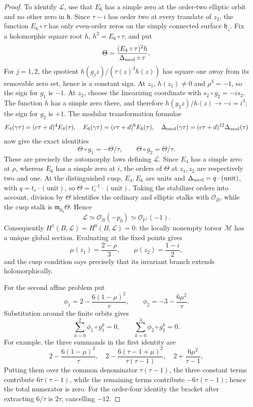 \begin{proof}
To identify \(\mathcal L\), use that \(E_6\) has a simple zero at the
order-two elliptic orbit and no other zero in \(\mathfrak h\).  Since
\(\tau-i\) has order two at every translate of \(z_2\), the function
\(E_6\circ\tau\) has only even-order zeros on the simply connected surface
\(\mathfrak h_z\).  Fix a holomorphic square root \(h\),
\(h^2=E_6\circ\tau\), and put
\[
 \Theta=\frac{(E_4\circ\tau)^2h}{\Delta_{\rm mod}\circ\tau}.
\]
For \(j=1,2\), the quotient
\(h(g_jz)/(\tau(z)^3h(z))\) has square one away from its removable zero
set, hence is a constant sign.  At \(z_1\), \(h(z_1)\ne0\) and
\(\rho^3=-1\), so the sign for \(g_1\) is \(-1\).  At \(z_2\), choose the
linearizing coordinate with \(s_2\circ g_2=-is_2\).  The function \(h\) has
a simple zero there, and therefore
\(h(g_2z)/h(z)\to-i=i^3\); the sign for \(g_2\) is \(+1\).  The modular
transformation formulae
\[
 E_4(\gamma\tau)=(c\tau+d)^4E_4(\tau),\quad
 E_6(\gamma\tau)=(c\tau+d)^6E_6(\tau),\quad
 \Delta_{\rm mod}(\gamma\tau)=(c\tau+d)^{12}\Delta_{\rm mod}(\tau)
\]
now give the exact identities
\[
 \Theta\circ g_1=-\Theta/\tau,\qquad
 \Theta\circ g_2=\Theta/\tau.
 \tag{2.1e}
\]
These are precisely the automorphy laws defining \(\mathcal L\).  Since
\(E_4\) has a simple zero at \(\rho\), whereas \(E_6\) has a simple zero
at \(i\), the orders of \(\Theta\) at \(z_1,z_2\) are respectively two
and one.  At the distinguished cusp, \(E_4,E_6\) are units and
\(\Delta_{\rm mod}=q\cdot(\text{unit})\), with
\(q=t_c\cdot(\text{unit})\), so
\(\Theta=t_c^{-1}\cdot(\text{unit})\).
Taking the stabilizer orders into account, division by \(\Theta\) identifies
the ordinary and elliptic stalks with \(\mathcal O_B\), while the cusp stalk
is \(\mathfrak m_{p_0}\Theta\).  Hence
\[
 \mathcal L\simeq\mathcal O_B(-p_0)\simeq\mathcal O_{\mathbb P^1}(-1).
\]
Consequently \(H^1(B,\mathcal L)=H^0(B,\mathcal L)=0\): the locally
nonempty torsor \(\mathcal M\) has a unique global section.  Evaluating at
the fixed points gives
\[
 \mu(z_1)=\frac{2-\rho}{3},\qquad
 \mu(z_2)=\frac{1-i}{2},
\]
and the cusp condition says precisely that its invariant branch extends
holomorphically.

For the second affine problem put
\[
 \phi_1=2-\frac{6(1-\mu)^2}{\tau},\qquad
 \phi_2=-3-\frac{6\mu^2}{\tau}.
\]
Substitution around the finite orbits gives
\[
 \sum_{k=0}^{2}\phi_1\circ g_1^k=0,
 \qquad
 \sum_{k=0}^{3}\phi_2\circ g_2^k=0.
 \tag{2.1c}
\]
For example, the three summands in the first identity are
\[
2-\frac{6(1-\mu)^2}{\tau},\quad
2-\frac{6(\tau-1+\mu)^2}{\tau(\tau-1)},\quad
2+\frac{6\mu^2}{\tau-1},
\]
 Putting them over the common denominator \(\tau(\tau-1)\), the three
 constant terms contribute \(6\tau(\tau-1)\), while the remaining terms
 contribute \(-6\tau(\tau-1)\); hence the total numerator is zero.  For the
 order-four identity the
bracket after extracting \(6/\tau\) is \(2\tau\), cancelling \(-12\).


\end{proof}
